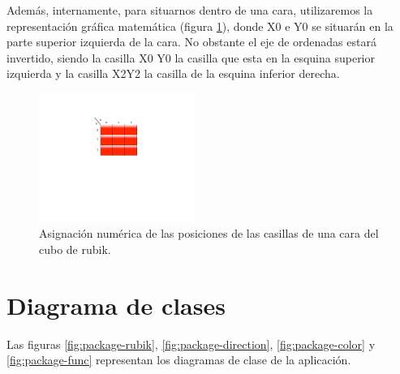 Además, internamente, para situarnos dentro de una cara, utilizaremos la
representación gráfica matemática (figura \ref{fig:rubikfaceposition}), donde
X0 e Y0 se situarán en la parte superior izquierda de la cara. No obstante el eje de ordenadas estará invertido, siendo la casilla X0 Y0 la casilla que esta en la esquina superior izquierda y la casilla X2Y2 la casilla de la esquina inferior derecha.

\begin{figure}[t]
\centering
\includegraphics[width=0.45\textwidth]{figs/pdf/rubikfaceposition}
\caption{Asignación numérica de las posiciones de las casillas de una cara
del cubo de rubik.}
\label{fig:rubikfaceposition}
\end{figure}


\clearpage

\section{Diagrama de clases}\label{sec:dia-clases}

Las figuras \ref{fig:package-rubik}, \ref{fig:package-direction},
\ref{fig:package-color} y \ref{fig:package-func} representan los diagramas de
clase de la aplicación.

